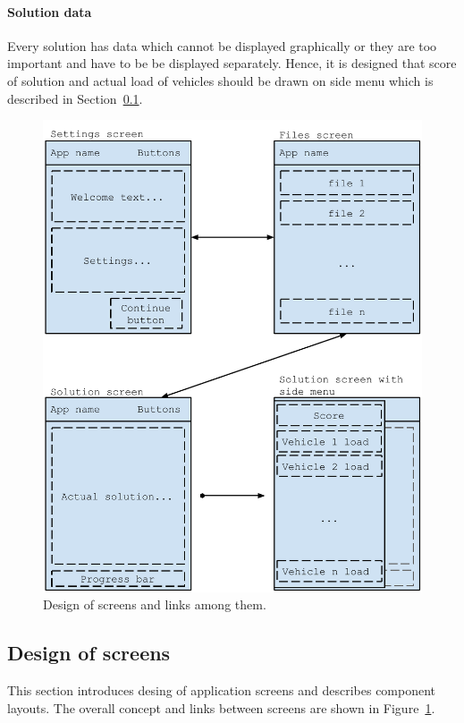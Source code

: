 \paragraph{Solution data}
Every solution has data which cannot be displayed graphically or they are too important and have to be be displayed
separately. Hence, it is designed that score of solution and actual load of vehicles should be drawn on side menu which
is described in Section~\ref{ScreenDesignSection}.

\begin{figure}[h!]
    \centering
    \includegraphics[scale=0.7]{fig/sceen_design.pdf}
    \caption{Design of screens and links among them.}
    \label{ScreenDesignFigure}
\end{figure}

\subsection{Design of screens}\label{ScreenDesignSection}
This section introduces desing of application screens and describes component layouts. The overall concept and links
between screens are shown in Figure~\ref{ScreenDesignFigure}.

